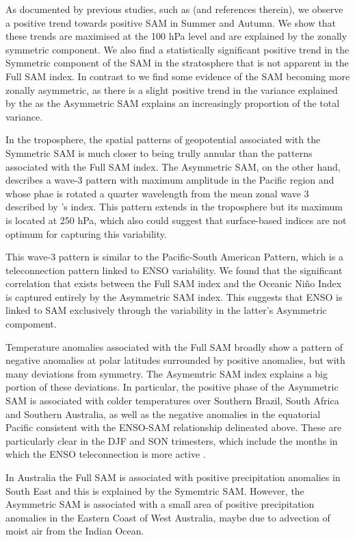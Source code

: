 \documentclass[twocol]{ametsocV5}
\begin{document}
As documented by previous studies, such as \citet{fogt2020} (and
references therein), we observe a positive trend towards positive SAM in
Summer and Autumn. We show that these trends are maximised at the 100
hPa level and are explained by the zonally symmetric component. We also
find a statistically significant positive trend in the Symmetric
component of the SAM in the stratosphere that is not apparent in the
Full SAM index. In contrast to \citet{fogt2012} we find some evidence of
the SAM becoming more zonally asymmetric, as there is a slight positive
trend in the variance explained by the as the Asymmetric SAM explains an
increasingly proportion of the total variance.

In the troposphere, the spatial patterns of geopotential associated with
the Symmetric SAM is much closer to being trully annular than the
patterns associated with the Full SAM index. The Asymmetric SAM, on the
other hand, describes a wave-3 pattern with maximum amplitude in the
Pacific region and whose phae is rotated a quarter wavelength from the
mean zonal wave 3 described by \citet{raphael2004}'s index. This pattern
extends in the troposphere but its maximum is located at 250 hPa, which
also could suggest that surface-based indices are not optimum for
capturing this variability.

This wave-3 pattern is similar to the Pacific-South American Pattern,
which is a teleconnection pattern linked to ENSO variability. We found
that the significant correlation that exists between the Full SAM index
and the Oceanic Niño Index is captured entirely by the Asymmetric SAM
index. This suggests that ENSO is linked to SAM exclusively through the
variability in the latter's Asymmetric compoment.

Temperature anomalies associated with the Full SAM broadly show a
pattern of negative anomalies at polar latitudes surrounded by positive
anomalies, but with many deviations from symmetry. The Asymemtric SAM
index explains a big portion of these deviations. In particular, the
positive phase of the Asymmetric SAM is associated with colder
temperatures over Southern Brazil, South Africa and Southern Australia,
as well as the negative anomalies in the equatorial Pacific consistent
with the ENSO-SAM relationship delineated above. These are particularly
clear in the DJF and SON trimesters, which include the months in which
the ENSO teleconnection is more active \citep[\citet{fogt2011},
\citet{cai2020a}]{cazes-boezio2003}.

In Australia the Full SAM is associated with positive precipitation
anomalies in South East and this is explained by the Symemtric SAM.
However, the Asymmetric SAM is associated with a small area of positive
precipitation anomalies in the Eastern Coast of West Australia, maybe
due to advection of moist air from the Indian Ocean.
\end{document}

